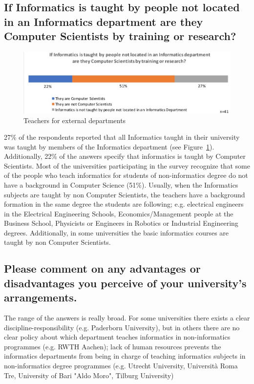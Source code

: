 \subsection{If Informatics is taught by people not located in an Informatics department are they Computer Scientists by training or research?}

\begin{figure}[h]
\includegraphics[width = \linewidth]{charts/2d.jpg}
\caption{Teachers for external departments}
\label{sect3:whoteaches}
\end{figure}
27\% of the respondents reported that all Informatics taught in their university was taught by members of the Informatics department (see Figure~\ref{sect3:whoteaches}).
Additionally, 22\% of the answers specify that informatics is taught by Computer Scientists. 
Most of the universities participating in the survey recognize that some of the people who teach informatics for students of non-informatics degree do not have a background in Computer Science (51\%). Usually, when the Informatics subjects are  taught by non Computer Scientists, the teachers have a background formation in the same degree the students are following; e.g. electrical engineers in the Electrical Engineering Schools, Economics/Management people at the Business School, Physicists or Engineers in Robotics or Industrial Engineering degrees. Additionally, in some universities the basic informatics courses  are taught by non Computer Scientists.   


\subsection{Please comment on any advantages or disadvantages you perceive of your university's arrangements.}

The range of the answers is really broad. For some universities there exists a clear discipline-responsibility (e.g. Paderborn University), but in others there are no clear policy about which department teaches informatics in non-informatics programmes (e.g. RWTH Aachen); lack of human resources prevents the informatics departments from being in charge of teaching informatics subjects in non-informatics degree programmes (e.g. Utrecht University, Università Roma Tre, University of Bari "Aldo Moro",  Tilburg University)
